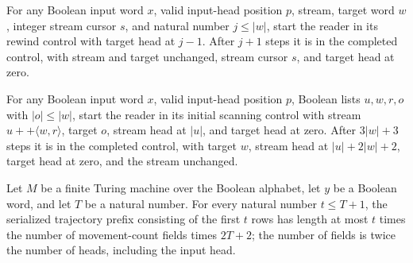 \begin{lemma}
\label{Complexity.clRead_rewind}
\leanok
{}
For any Boolean input word $x$, valid input-head position $p$, stream, target word $w$,
integer stream cursor $s$, and natural number $j \le |w|$, start the reader in its
rewind control with target head at $j-1$. After $j+1$ steps it is in the completed
control, with stream and target unchanged, stream cursor $s$, and target head at zero.
\end{lemma}

\begin{lemma}
\label{Complexity.clRead_run}
\leanok
{}
For any Boolean input word $x$, valid input-head position $p$, Boolean lists $u,w,r,o$
with $|o| \le |w|$, start the reader in its initial scanning control with stream $u ++
\langle w,r\rangle$, target $o$, stream head at $|u|$, and target head at zero. After
$3|w|+3$ steps it is in the completed control, with target $w$, stream head at
$|u|+2|w|+2$, target head at zero, and the stream unchanged.
\end{lemma}

\begin{lemma}
\label{Complexity.clRecords_length}
\leanok
{}
Let $M$ be a finite Turing machine over the Boolean alphabet, let $y$ be a Boolean word,
and let $T$ be a natural number. For every natural number $t\le T+1$, the serialized
trajectory prefix consisting of the first $t$ rows has length at most $t$ times the
number of movement-count fields times $2T+2$; the number of fields is twice the number
of heads, including the input head.
\end{lemma}

